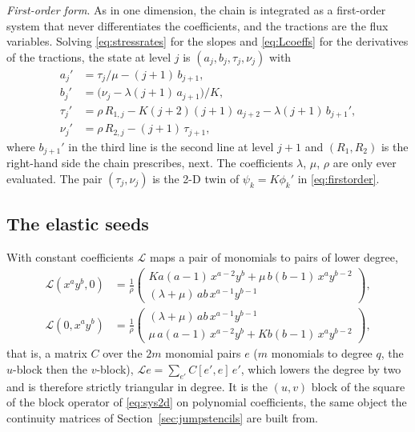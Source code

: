 \documentclass[11pt]{amsart}
\theoremstyle{definition}
\theoremstyle{remark}
\newcommand{\para}[1]{\par\smallskip\noindent\textit{#1}.\enspace}
\begin{document}
\para{First-order form}
As in one dimension, the chain is integrated as a first-order system that
never differentiates the coefficients, and the tractions are the flux
variables. Solving \eqref{eq:stressrates} for the slopes and
\eqref{eq:Lcoeffs} for the derivatives of the tractions, the state at
level $j$ is $(a_j, b_j, \tau_j, \nu_j)$ with
\begin{equation}
  \label{eq:firstorder2d}
  \begin{aligned}
  a_j' &= \tau_j / \mu - (j + 1)\, b_{j+1}, \\
  b_j' &= \bigl( \nu_j - \lambda (j + 1)\, a_{j+1} \bigr) / K, \\
  \tau_j' &= \rho\, R_{1, j} - K (j + 2)(j + 1)\, a_{j+2}
    - \lambda (j + 1)\, b_{j+1}', \\
  \nu_j' &= \rho\, R_{2, j} - (j + 1)\, \tau_{j+1},
  \end{aligned}
\end{equation}
where $b_{j+1}'$ in the third line is the second line at level $j + 1$
and $(R_1, R_2)$ is the right-hand side the chain prescribes, next. The
coefficients $\lambda$, $\mu$, $\rho$ are only ever evaluated. The pair
$(\tau_j, \nu_j)$ is the 2-D twin of $\psi_k = K \phi_k'$ in
\eqref{eq:firstorder}.

\subsection{The elastic seeds}
\label{sec:elasticseeds}
With constant coefficients $\mathcal{L}$ maps a pair of monomials to
pairs of lower degree,
\begin{equation}
  \label{eq:Lmono}
  \begin{aligned}
  \mathcal{L} (x^a y^b, 0) &= \frac{1}{\rho} \begin{pmatrix}
    K a (a - 1)\, x^{a-2} y^b + \mu\, b (b - 1)\, x^a y^{b-2} \\
    (\lambda + \mu)\, a b\, x^{a-1} y^{b-1} \end{pmatrix}, \\[4pt]
  \mathcal{L} (0, x^a y^b) &= \frac{1}{\rho} \begin{pmatrix}
    (\lambda + \mu)\, a b\, x^{a-1} y^{b-1} \\
    \mu\, a (a - 1)\, x^{a-2} y^b + K b (b - 1)\, x^a y^{b-2} \end{pmatrix},
  \end{aligned}
\end{equation}
that is, a matrix $C$ over the $2m$ monomial pairs $e$ ($m$ monomials to
degree $q$, the $u$-block then the $v$-block), $\mathcal{L} e =
\sum_{e'} C[e', e]\, e'$, which lowers the degree by two and is therefore
strictly triangular in degree. It is the $(u, v)$ block of the square of
the block operator of \eqref{eq:sys2d} on polynomial coefficients, the
same object the continuity matrices of Section~\ref{sec:jumpstencils}
are built from.
\end{document}
